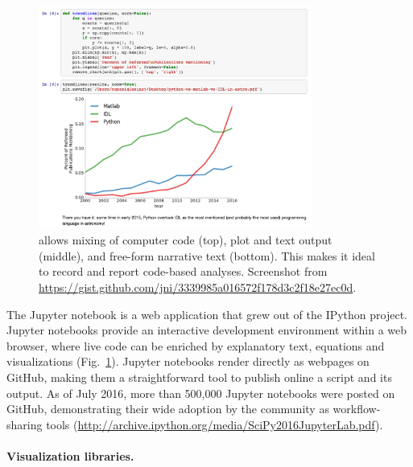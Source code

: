 \documentclass[twocolumn]{bmcart}%
\begin{document}
\begin{figure}[ht!]
    \centerline{\includegraphics[width=0.8\textwidth]{jupyter_example}}
    \caption{ allows mixing of computer code (top),
             plot and text output (middle), and free-form narrative text (bottom).
             This makes it ideal to record and report code-based analyses.
             Screenshot from \url{https://gist.github.com/jni/3339985a016572f178d3c2f18e27ec0d}.
 \label{fig:jupyter}}
\end{figure}

The Jupyter notebook \citep{Kluyver2016} is a web application that grew
out of the IPython project. Jupyter notebooks provide an interactive
development environment within a web browser, where live code can be
enriched by explanatory text, equations and visualizations
(Fig.~\ref{fig:jupyter}). Jupyter notebooks render directly as webpages
on GitHub, making them a straightforward tool to publish online a
script and its output. As of July 2016, more than 500,000 Jupyter
notebooks were posted on GitHub, demonstrating their wide adoption by the
community as workflow-sharing tools
(\url{http://archive.ipython.org/media/SciPy2016JupyterLab.pdf}).


\paragraph{Visualization libraries.}
\end{document}
